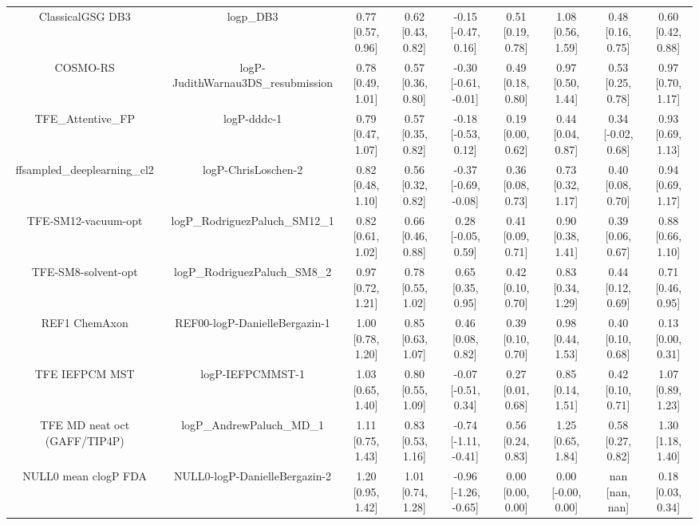 \documentclass{article}
\begin{document}
\begin{center}
\begin{longtable}{|ccccccccc|}
             ClassicalGSG DB3 &                                      logp\_DB3 &  0.77 [0.57, 0.96] &  0.62 [0.43, 0.82] &   -0.15 [-0.47, 0.16] &  0.51 [0.19, 0.78] &     1.08 [0.56, 1.59] &     0.48 [0.16, 0.75] &     0.60 [0.42, 0.88] \\
                     COSMO-RS &             logP-JudithWarnau3DS\_resubmission &  0.78 [0.49, 1.01] &  0.57 [0.36, 0.80] &  -0.30 [-0.61, -0.01] &  0.49 [0.18, 0.80] &     0.97 [0.50, 1.44] &     0.53 [0.25, 0.78] &     0.97 [0.70, 1.17] \\
             TFE_Attentive_FP &                                    logP-dddc-1 &  0.79 [0.47, 1.07] &  0.57 [0.35, 0.82] &   -0.18 [-0.53, 0.12] &  0.19 [0.00, 0.62] &     0.44 [0.04, 0.87] &    0.34 [-0.02, 0.68] &     0.93 [0.69, 1.13] \\
   ffsampled_deeplearning_cl2 &                            logP-ChrisLoschen-2 &  0.82 [0.48, 1.10] &  0.56 [0.32, 0.82] &  -0.37 [-0.69, -0.08] &  0.36 [0.08, 0.73] &     0.73 [0.32, 1.17] &     0.40 [0.08, 0.70] &     0.94 [0.69, 1.17] \\
          TFE-SM12-vacuum-opt &                 logP\_RodriguezPaluch\_SM12\_1 &  0.82 [0.61, 1.02] &  0.66 [0.46, 0.88] &    0.28 [-0.05, 0.59] &  0.41 [0.09, 0.71] &     0.90 [0.38, 1.41] &     0.39 [0.06, 0.67] &     0.88 [0.66, 1.10] \\
          TFE-SM8-solvent-opt &                  logP\_RodriguezPaluch\_SM8\_2 &  0.97 [0.72, 1.21] &  0.78 [0.55, 1.02] &     0.65 [0.35, 0.95] &  0.42 [0.10, 0.70] &     0.83 [0.34, 1.29] &     0.44 [0.12, 0.69] &     0.71 [0.46, 0.95] \\
                REF1 ChemAxon &                  REF00-logP-DanielleBergazin-1 &  1.00 [0.78, 1.20] &  0.85 [0.63, 1.07] &     0.46 [0.08, 0.82] &  0.39 [0.10, 0.70] &     0.98 [0.44, 1.53] &     0.40 [0.10, 0.68] &     0.13 [0.00, 0.31] \\
               TFE IEFPCM MST &                               logP-IEFPCMMST-1 &  1.03 [0.65, 1.40] &  0.80 [0.55, 1.09] &   -0.07 [-0.51, 0.34] &  0.27 [0.01, 0.68] &     0.85 [0.14, 1.51] &     0.42 [0.10, 0.71] &     1.07 [0.89, 1.23] \\
 TFE MD neat oct (GAFF/TIP4P) &                      logP\_AndrewPaluch\_MD\_1 &  1.11 [0.75, 1.43] &  0.83 [0.53, 1.16] &  -0.74 [-1.11, -0.41] &  0.56 [0.24, 0.83] &     1.25 [0.65, 1.84] &     0.58 [0.27, 0.82] &     1.30 [1.18, 1.40] \\
         NULL0 mean clogP FDA &                  NULL0-logP-DanielleBergazin-2 &  1.20 [0.95, 1.42] &  1.01 [0.74, 1.28] &  -0.96 [-1.26, -0.65] &  0.00 [0.00, 0.00] &    0.00 [-0.00, 0.00] &        nan [nan, nan] &     0.18 [0.03, 0.34] \\

\end{longtable}
\end{center}
\end{document}
